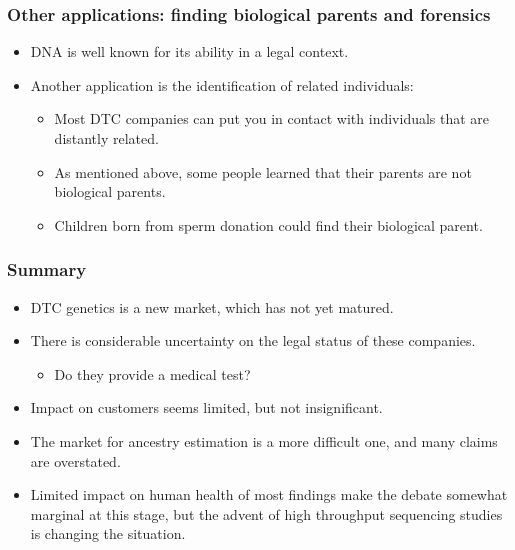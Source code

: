 \documentclass{beamer}
\begin{document}
\begin{frame}
  \frametitle{Other applications: finding biological parents and forensics}
  \begin{itemize}
  \item DNA is well known for its ability in a legal context.
  \item Another application is the identification of related individuals:
    \begin{itemize}
    \item Most DTC companies can put you in contact with individuals that are distantly related.
    \item As mentioned above, some people learned that their parents are not biological parents.
    \item Children born from sperm donation could find their biological parent.
    \end{itemize}
  \end{itemize}
\end{frame}




\begin{frame}
  \frametitle{Summary}
  \begin{itemize}
  \item DTC genetics is a new market, which has not yet matured.
  \item There is considerable uncertainty on the legal status of these companies.
    \begin{itemize}
    \item Do they provide a medical test?
    \end{itemize}
  \item Impact on customers seems limited, but not insignificant.
  \item The market for ancestry estimation is a more difficult one, and many claims are overstated.
  \item Limited impact on human health of most findings make the debate somewhat marginal at this stage, but the advent of high throughput sequencing studies is changing the situation.
  \end{itemize}
\end{frame}
\end{document}
